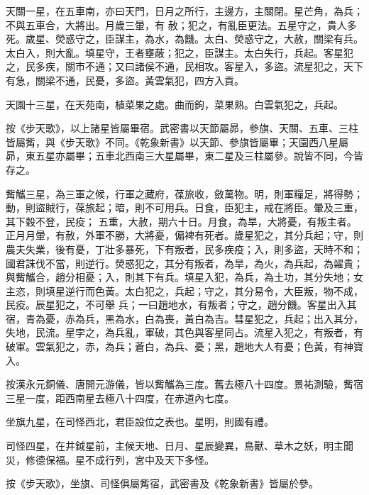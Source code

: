 \begin{pinyinscope}
 天關一星，在五車南，亦曰天門，日月之所行，主邊方，主關閉。星芒角，為兵；不與五車合，大將出。月歲三暈，有
 赦；犯之，有亂臣更法。五星守之，貴人多死。歲星、熒惑守之，臣謀主，為水，為饑。太白、熒惑守之，大赦，關梁有兵。太白入，則大亂。填星守，王者壅蔽；犯之，臣謀主。太白失行，兵起。客星犯之，民多疾，關市不通；又曰諸侯不通，民相攻。客星入，多盜。流星犯之，天下有急，關梁不通，民憂，多盜。黃雲氣犯，四方入貢。



 天園十三星，在天苑南，植菜果之處。曲而鉤，菜果熟。白雲氣犯之，兵起。



 按《步天歌》，以上諸星皆屬畢宿。武密書以天節屬昴，參旗、天關、五車、三柱皆屬觜，與《步天歌》不同。《乾象新書》以天節、參旗皆屬畢；天園西八星屬昴，東五星亦屬畢；五車北西南三大星屬畢，東二星及三柱屬參。說皆不同，今皆存之。



 觜觿三星，為三軍之候，行軍之藏府，葆旅收，斂萬物。明，則軍糧足，將得勢；動，則盜賊行，葆旅起；暗，則不可用兵。日食，臣犯主，戒在將臣。暈及三重，其下穀不登，民疫；
 五重，大赦，期六十日。月食，為旱，大將憂，有叛主者。正月月暈，有赦，外軍不勝，大將憂，偏裨有死者。歲星犯之，其分兵起；守，則農夫失業，後有憂，丁壯多暴死，下有叛者，民多疾疫；入，則多盜，天時不和；國君誅伐不當，則逆行。熒惑犯之，其分有叛者，為旱，為火，為兵起，為糴貴；與觜觿合，趙分相憂；入，則其下有兵。填星入犯，為兵，為土功，其分失地；女主恣，則填星逆行而色黃。太白犯之，兵起；守之，其分易令，大臣叛，物不成，民疫。辰星犯之，不可舉
 兵；一曰趙地水，有叛者；守之，趙分饑。客星出入其宿，青為憂，赤為兵，黑為水，白為喪，黃白為吉。彗星犯之，兵起；出入其分，失地，民流。星孛之，為兵亂，軍破，其色與客星同占。流星入犯之，有叛者，有破軍。雲氣犯之，赤，為兵；蒼白，為兵、憂；黑，趙地大人有憂；色黃，有神寶入。



 按漢永元銅儀、唐開元游儀，皆以觜觿為三度。舊去極八十四度。景祐測驗，觜宿三星一度，距西南星去極八十四度，在赤道內七度。



 坐旗九星，在司怪西北，君臣設位之表也。星明，則國有禮。



 司怪四星，在井鉞星前，主候天地、日月、星辰變異，鳥獸、草木之妖，明主聞災，修德保福。星不成行列，宮中及天下多怪。



 按《步天歌》，坐旗、司怪俱屬觜宿，武密書及《乾象新書》皆屬於參。




\end{pinyinscope}
